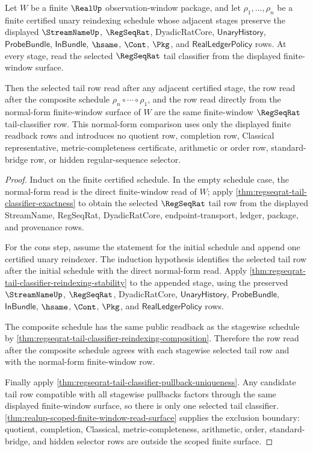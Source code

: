 \begin{theorem}
\label{thm:regseqrat-tail-classifier-reindexing-normal-form}
Let $W$ be a finite $\RealUp$ observation-window package, and let
$\rho_1,\ldots,\rho_n$ be a finite certified unary reindexing schedule whose
adjacent stages preserve the displayed $\StreamNameUp$, $\RegSeqRat$,
DyadicRatCore, $\mathsf{UnaryHistory}$, $\mathsf{ProbeBundle}$,
$\mathsf{InBundle}$, $\hsame$, $\Cont$, $\Pkg$, and
$\mathsf{RealLedgerPolicy}$ rows. At every stage, read the selected
$\RegSeqRat$ tail classifier from the displayed finite-window surface.

Then the selected tail row read after any adjacent certified stage, the row
read after the composite schedule $\rho_n\circ\cdots\circ\rho_1$, and the row
read directly from the normal-form finite-window surface of $W$ are the same
finite-window $\RegSeqRat$ tail-classifier row. This normal-form comparison
uses only the displayed finite readback rows and introduces no quotient row,
completion row, Classical representative, metric-completeness certificate,
arithmetic or order row, standard-bridge row, or hidden regular-sequence
selector.
\end{theorem}
\begin{proof}
Induct on the finite certified schedule. In the empty schedule case, the
normal-form read is the direct finite-window read of $W$; apply
\autoref{thm:regseqrat-tail-classifier-exactness} to obtain the selected
$\RegSeqRat$ tail row from the displayed StreamName, RegSeqRat, DyadicRatCore,
endpoint-transport, ledger, package, and provenance rows.

For the cons step, assume the statement for the initial schedule and append one
certified unary reindexer. The induction hypothesis identifies the selected
tail row after the initial schedule with the direct normal-form read. Apply
\autoref{thm:regseqrat-tail-classifier-reindexing-stability} to the appended
stage, using the preserved $\StreamNameUp$, $\RegSeqRat$, DyadicRatCore,
$\mathsf{UnaryHistory}$, $\mathsf{ProbeBundle}$, $\mathsf{InBundle}$,
$\hsame$, $\Cont$, $\Pkg$, and $\mathsf{RealLedgerPolicy}$ rows.

The composite schedule has the same public readback as the stagewise schedule
by \autoref{thm:regseqrat-tail-classifier-reindexing-composition}. Therefore
the row read after the composite schedule agrees with each stagewise selected
tail row and with the normal-form finite-window row.

Finally apply
\autoref{thm:regseqrat-tail-classifier-pullback-uniqueness}. Any candidate
tail row compatible with all stagewise pullbacks factors through the same
displayed finite-window surface, so there is only one selected tail classifier.
\autoref{thm:realup-scoped-finite-window-read-surface} supplies the exclusion
boundary: quotient, completion, Classical, metric-completeness, arithmetic,
order, standard-bridge, and hidden selector rows are outside the scoped finite
surface.
\end{proof}

